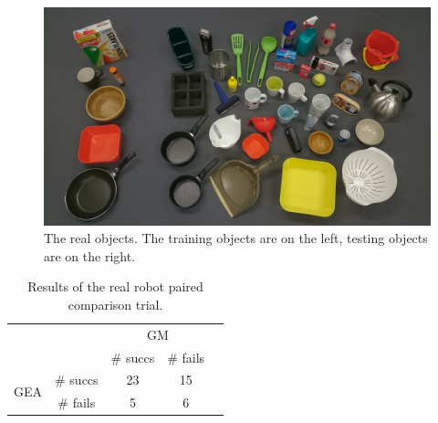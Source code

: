 \begin{figure}
\begin{center}
  \includegraphics[width=0.9\linewidth]{images/objects.jpg}
  \end{center}
  \caption{The real objects. The training objects are on the left, testing objects are on the right.}
  \label{fig:real-objects}
\end{figure}


\begin{table}
\begin{center}
\caption{Results of the real robot paired comparison trial.}
\label{my-label}
\begin{tabular}{|cc|c|c|l}
\cline{1-4}
                                           &         & \multicolumn{2}{c|}{GM} &  \\ \cline{3-4}
                                           &         & \# succs    & \# fails    &  \\ \cline{1-4}
\multicolumn{1}{|c|}{\multirow{2}{*}{GEA}} & \# succs & 23         & 15         &  \\
\multicolumn{1}{|c|}{}                     & \# fails & 5          & 6          &  \\ \cline{1-4}
\end{tabular}
\end{center}
\label{tab:robot-results}
\end{table}


